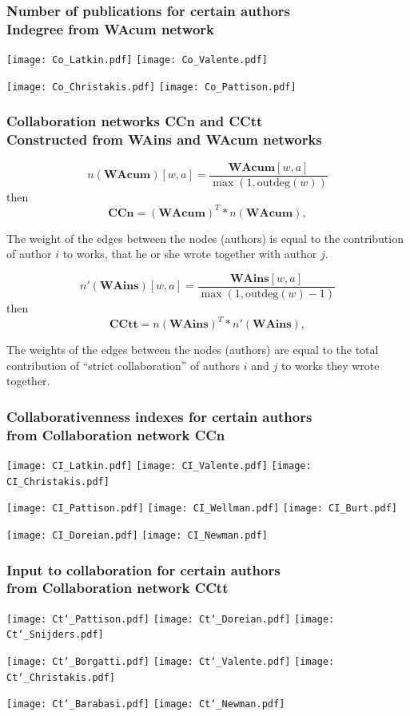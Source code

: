 \documentclass[hyperref={pdfstartview={FitBH -32768},
                         pdfpagemode=FullScreen,
                         plainpages=false,
                         colorlinks=true}
              ]{beamer}
\begin{document}
\begin{frame}[fragile]
\frametitle{Number of publications for certain authors \\ \normalsize Indegree from WAcum network }

\centerline{
\texttt{[image: Co\_Latkin.pdf]} 
\texttt{[image: Co\_Valente.pdf]}}
\centerline{
\texttt{[image: Co\_Christakis.pdf]} 
\texttt{[image: Co\_Pattison.pdf]}}

\end{frame}  

\begin{frame}[fragile]
\frametitle{Collaboration networks CCn and CCtt \\ \normalsize Constructed from WAins and WAcum networks } 

\footnotesize 

\[ n(\mathbf{WAcum})[w,a] = \frac {\mathbf{WAcum}[w,a]}{\max(1,\textrm{outdeg}(w))}\]
then 
\[ \mathbf{CCn} = (\mathbf{WAcum}) ^ T * n(\mathbf{WAcum}), \]

The weight of the edges between the nodes (authors) is equal to the contribution of author $i$ to works, that he or she wrote together with author $j$. 

\[ n'(\mathbf{WAins})[w,a] = \frac {\mathbf{WAins}[w,a]}{\max(1,\textrm{outdeg}(w)-1)}\] 
then 
\[ \mathbf{CCtt} = n(\mathbf{WAins}) ^ T * n'(\mathbf{WAins}), \]

\footnotesize 
The weights of the edges between the nodes (authors) are equal to the total contribution of “strict collaboration” of authors $i$ and $j$ to works they wrote together.

\end{frame}  
 
\begin{frame}[fragile]
\frametitle{Collaborativenness indexes for certain authors \\ \normalsize from Collaboration network CCn  } 

\centerline{
\texttt{[image: CI\_Latkin.pdf]} 
\texttt{[image: CI\_Valente.pdf]} 
\texttt{[image: CI\_Christakis.pdf]}}
\centerline{
\texttt{[image: CI\_Pattison.pdf]} 
\texttt{[image: CI\_Wellman.pdf]} 
\texttt{[image: CI\_Burt.pdf]}}
\centerline{
\texttt{[image: CI\_Doreian.pdf]}
\texttt{[image: CI\_Newman.pdf]}}

\end{frame}   

\begin{frame}[fragile]
\frametitle{Input to collaboration for certain authors \\ \normalsize from Collaboration network CCtt } 

\centerline{
\texttt{[image: Ct`\_Pattison.pdf]}
\texttt{[image: Ct`\_Doreian.pdf]}
\texttt{[image: Ct`\_Snijders.pdf]}}
\centerline{
\texttt{[image: Ct`\_Borgatti.pdf]} 
\texttt{[image: Ct`\_Valente.pdf]}
\texttt{[image: Ct`\_Christakis.pdf]}}
\centerline{
\texttt{[image: Ct`\_Barabasi.pdf]} 
\texttt{[image: Ct`\_Newman.pdf]}}

\end{frame}   
\end{document}
